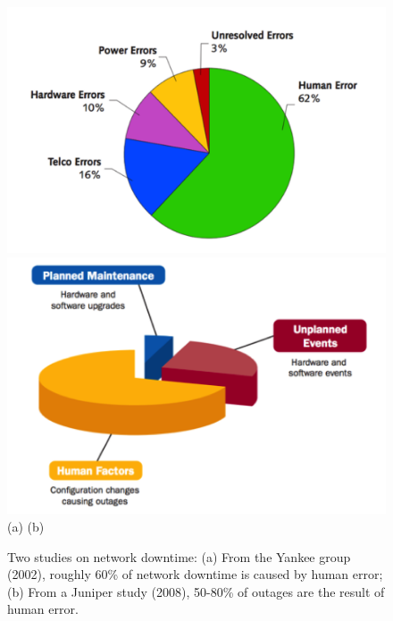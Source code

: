 \begin{figure}[t]
  \centering
  \includegraphics[width=.45\textwidth]{figures/errors1}
  \hspace{1cm}
  \includegraphics[width=.45\textwidth]{figures/errors2} \\
  (a)  \hspace{3in} (b)
  \caption{Two studies on network downtime:  (a) From the Yankee group (2002),
roughly 60\% of network downtime is caused by human error; (b) From a Juniper
study (2008), 50-80\% of outages are the result of human error.}
  \label{fig:network-downtime}
\end{figure}

